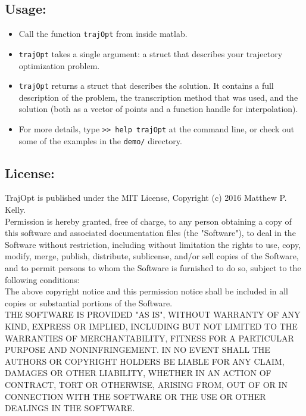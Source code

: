 \subsection{Usage: }
\begin{itemize} \setlength\itemsep{-0.1em}
\item Call the function \texttt{trajOpt} from inside matlab.
\item \texttt{trajOpt} takes a single argument: a struct that describes your trajectory optimization problem.
\item \texttt{trajOpt} returns a struct that describes the solution. It contains a full description of the problem, the transcription method that was used, and the solution (both as a vector of points and a function handle for interpolation).
\item For more details, type \texttt{>> help trajOpt} at the command line, or check out some of the examples in the \texttt{demo/} directory.
\end{itemize}

\subsection{License: }
TrajOpt is published under the MIT License, Copyright (c) 2016 Matthew P. Kelly.  \vspace{0.5em} \\

Permission is hereby granted, free of charge, to any person obtaining a copy
of this software and associated documentation files (the "Software"), to deal
in the Software without restriction, including without limitation the rights
to use, copy, modify, merge, publish, distribute, sublicense, and/or sell
copies of the Software, and to permit persons to whom the Software is
furnished to do so, subject to the following conditions:  \vspace{0.5em} \\

The above copyright notice and this permission notice shall be included in
all copies or substantial portions of the Software.  \vspace{0.5em} \\

THE SOFTWARE IS PROVIDED "AS IS", WITHOUT WARRANTY OF ANY KIND, EXPRESS OR
IMPLIED, INCLUDING BUT NOT LIMITED TO THE WARRANTIES OF MERCHANTABILITY,
FITNESS FOR A PARTICULAR PURPOSE AND NONINFRINGEMENT. IN NO EVENT SHALL THE
AUTHORS OR COPYRIGHT HOLDERS BE LIABLE FOR ANY CLAIM, DAMAGES OR OTHER
LIABILITY, WHETHER IN AN ACTION OF CONTRACT, TORT OR OTHERWISE, ARISING FROM,
OUT OF OR IN CONNECTION WITH THE SOFTWARE OR THE USE OR OTHER DEALINGS IN
THE SOFTWARE.
